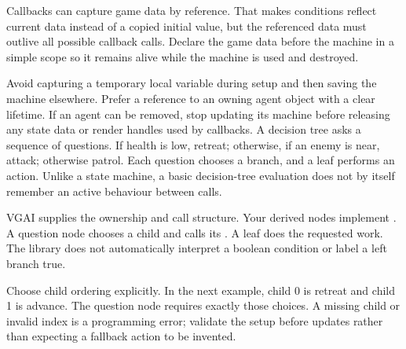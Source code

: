 \documentclass[11pt,a4paper]{article}
\begin{document}
Callbacks can capture game data by reference. That makes conditions reflect current data instead of a copied initial value, but the referenced data must outlive all possible callback calls. Declare the game data before the machine in a simple scope so it remains alive while the machine is used and destroyed.

Avoid capturing a temporary local variable during setup and then saving the machine elsewhere. Prefer a reference to an owning agent object with a clear lifetime. If an agent can be removed, stop updating its machine before releasing any state data or render handles used by callbacks.
A decision tree asks a sequence of questions. If health is low, retreat; otherwise, if an enemy is near, attack; otherwise patrol. Each question chooses a branch, and a leaf performs an action. Unlike a state machine, a basic decision-tree evaluation does not by itself remember an active behaviour between calls.

VGAI supplies the ownership and call structure. Your derived nodes implement . A question node chooses a child and calls its . A leaf does the requested work. The library does not automatically interpret a boolean condition or label a left branch true.

\begin{center}\end{center}

Choose child ordering explicitly. In the next example, child 0 is retreat and child 1 is advance. The question node requires exactly those choices. A missing child or invalid index is a programming error; validate the setup before updates rather than expecting a fallback action to be invented.
\end{document}
